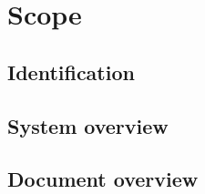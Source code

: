 \label{chp_scope}
\chapter{Scope}

\section{Identification}

\section{System overview}

\section{Document overview}
